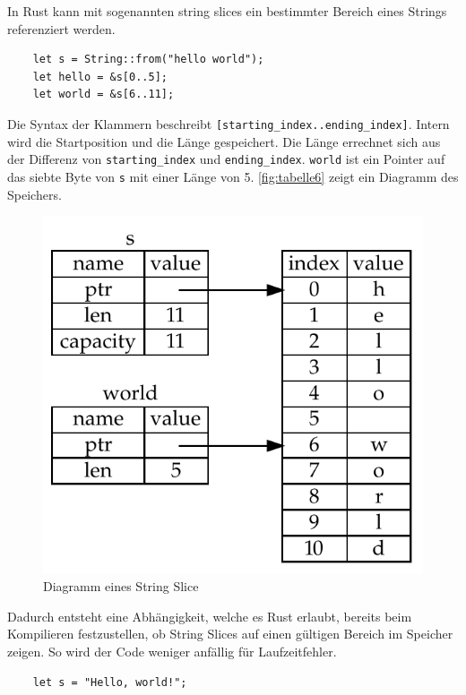 In Rust kann mit sogenannten \glqq string slices\grqq{} ein bestimmter Bereich eines Strings referenziert werden.

\begin{lstlisting}
    let s = String::from("hello world");
    let hello = &s[0..5];
    let world = &s[6..11];
\end{lstlisting}

Die Syntax der Klammern beschreibt \verb"[starting_index..ending_index]". Intern wird die Startposition und die Länge gespeichert. Die Länge errechnet sich aus der Differenz von \verb"starting_index" und \verb"ending_index". \verb"world" ist ein Pointer auf das siebte Byte von \verb"s" mit einer Länge von 5. \autoref{fig:tabelle6} zeigt ein Diagramm des Speichers.

\begin{figure}[htbp]
    \centering
    \includegraphics[scale=0.9]{Programmierung/Tabelle6.pdf}
    \caption{Diagramm eines String Slice}
    \label{fig:tabelle6}
\end{figure}

Dadurch entsteht eine Abhängigkeit, welche es Rust erlaubt, bereits beim Kompilieren festzustellen, ob String Slices auf einen gültigen Bereich im Speicher zeigen. So wird der Code weniger anfällig für Laufzeitfehler.

\begin{lstlisting}
    let s = "Hello, world!";
\end{lstlisting}

